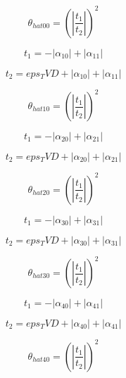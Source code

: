 \documentclass{article}
\begin{document}
\begin{dmath}\theta_{hat 00} = \left(\left|{\frac{t_{1}}{t_{2}}}\right| \right)^{2}\end{dmath}

\begin{dmath}t_{1} = - \left|{\alpha_{10}}\right| + \left|{\alpha_{11}}\right|\end{dmath}

\begin{dmath}t_{2} = eps_TVD + \left|{\alpha_{10}}\right| + \left|{\alpha_{11}}\right|\end{dmath}

\begin{dmath}\theta_{hat 10} = \left(\left|{\frac{t_{1}}{t_{2}}}\right| \right)^{2}\end{dmath}

\begin{dmath}t_{1} = - \left|{\alpha_{20}}\right| + \left|{\alpha_{21}}\right|\end{dmath}

\begin{dmath}t_{2} = eps_TVD + \left|{\alpha_{20}}\right| + \left|{\alpha_{21}}\right|\end{dmath}

\begin{dmath}\theta_{hat 20} = \left(\left|{\frac{t_{1}}{t_{2}}}\right| \right)^{2}\end{dmath}

\begin{dmath}t_{1} = - \left|{\alpha_{30}}\right| + \left|{\alpha_{31}}\right|\end{dmath}

\begin{dmath}t_{2} = eps_TVD + \left|{\alpha_{30}}\right| + \left|{\alpha_{31}}\right|\end{dmath}

\begin{dmath}\theta_{hat 30} = \left(\left|{\frac{t_{1}}{t_{2}}}\right| \right)^{2}\end{dmath}

\begin{dmath}t_{1} = - \left|{\alpha_{40}}\right| + \left|{\alpha_{41}}\right|\end{dmath}

\begin{dmath}t_{2} = eps_TVD + \left|{\alpha_{40}}\right| + \left|{\alpha_{41}}\right|\end{dmath}

\begin{dmath}\theta_{hat 40} = \left(\left|{\frac{t_{1}}{t_{2}}}\right| \right)^{2}\end{dmath}
\end{document}
